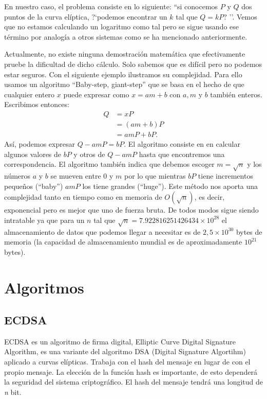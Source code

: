 \documentclass[11pt]{article}
\begin{document}
En nuestro caso, el problema consiste en lo siguiente: ``si conocemos $ P $ y $ Q $ dos puntos de la curva elíptica, ?`podemos encontrar un $ k $ tal que $ Q = kP $? ''. Vemos que no estamos calculando un logaritmo como tal pero se sigue usando ese término por analogía a otros sistemas como se ha mencionado anteriormente. 

Actualmente, no existe ninguna demostración matemática que efectivamente pruebe la dificultad de dicho cálculo. Solo sabemos que es difícil pero no podemos estar seguros. Con el siguiente ejemplo ilustramos su complejidad. Para ello usamos un algoritmo ``Baby-step, giant-step'' que se basa en el hecho de que cualquier entero $ x $ puede expresar como $ x = am+b $ con $ a,m \text{ y } b$ también enteros. Escribimos entonces:
\begin{equation*}
\begin{split}
Q &= xP \\
  &= (am+b)P\\
  &=amP + bP.
\end{split}
\end{equation*}
Así, podemos expresar $ Q - amP  = bP $. El algoritmo consiste en en calcular algunos valores de $ bP $ y otros de $ Q-amP $ hasta que encontremos una correspondencia. El algoritmo también indica que debemos escoger $ m = \sqrt{n} $ y los números $ a $ y $ b $ se mueven entre 0 y $ m $ por lo que mientras $ bP $ tiene incrementos pequeños (``baby'') $ amP $ los tiene grandes (``huge''). Este método nos aporta una complejidad tanto en tiempo como en memoria de $ O(\sqrt{n}) $, es decir, exponencial pero es mejor que uno de fuerza bruta. De todos modos sigue siendo intratable ya que para un $  n  $ tal que $ \sqrt{n} = 7.922816251426434 \times 10^{28} $ el almacenamiento de datos que podemos llegar a necesitar es de $ 2,5\times10^{30} $ bytes de memoria (la capacidad de almacenamiento mundial es de aproximadamente $ 10^{21} $ bytes).

\section{Algoritmos}

\subsection{ECDSA}

ECDSA es un algoritmo de firma digital, Elliptic Curve Digital Signature Algorithm, es una variante del algoritmo DSA (Digital Signature Algortihm) aplicado a curvas elípticas. Trabaja con el hash del mensaje en lugar de con el propio mensaje. La elección de la función hash es importante, de esto dependerá la seguridad del sistema criptográfico. El hash del mensaje tendrá una longitud de \textit{n} bit.
\end{document}
